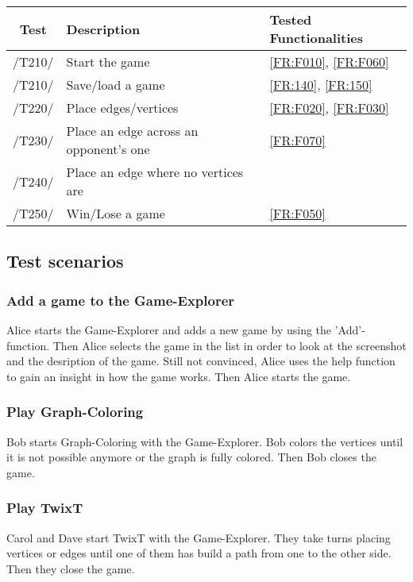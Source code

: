 \begin{tabular}{cll}

\hline
\textbf{Test} & \textbf{Description} & \textbf{Tested Functionalities} \\
\hline
/T210/ & Start the game & \ref{FR:F010}, \ref{FR:F060} \\
/T210/ & Save/load a game & \ref{FR:140}, \ref{FR:150} \\
/T220/ & Place edges/vertices & \ref{FR:F020}, \ref{FR:F030} \\
/T230/ & Place an edge across an opponent's one & \ref{FR:F070} \\
/T240/ & Place an edge where no vertices are & \\
/T250/ & Win/Lose a game & \ref{FR:F050}\\
\hline

\end{tabular}

\subsection{Test scenarios}

\subsubsection{Add a game to the Game-Explorer}

Alice starts the Game-Explorer and adds a new game by using the 'Add'-function. Then Alice selects the game in the list in order to look at the screenshot and the desription of the game. Still not convinced, Alice uses the help function to gain an insight in how the game works. Then Alice starts the game.

\subsubsection{Play Graph-Coloring}

Bob starts Graph-Coloring with the Game-Explorer. Bob colors the vertices until it is not possible anymore or the graph is fully colored. Then Bob closes the game.

\subsubsection{Play TwixT}

Carol and Dave start TwixT with the Game-Explorer. They take turns placing vertices or edges until one of them has build a path from one to the other side. Then they close the game.
